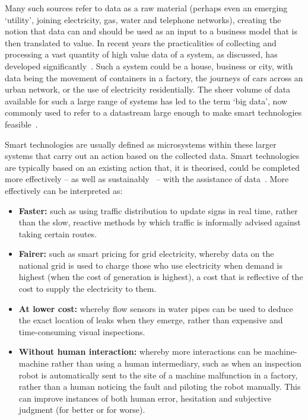\documentclass[journal]{IEEEtran}
\begin{document}
Many such sources refer to data as a raw material (perhaps even an
emerging `utility', joining electricity, gas, water and telephone
networks), creating the notion that data can and should be used as an
input to a business model that is then translated to value. In recent
years the practicalities of collecting and processing a vast quantity
of high value data of a system, as discussed, has developed
significantly~\cite{arup-et-al:2011}. Such a system could be a house,
business or city, with data being the movement of containers in a
factory, the journeys of cars across an urban network, or the use of
electricity residentially. The sheer volume of data available for such
a large range of systems has led to the term `big data’, now commonly
used to refer to a datastream large enough to make smart technologies
feasible~\cite{hollands:2008,ibmsmartcities:2009,ciscoconcities:2010}.

Smart technologies are usually defined as microsystems within these
larger systems that carry out an action based on the collected
data. Smart technologies are typically based on an existing action
that, it is theorised, could be completed more effectively -- as well
as sustainably~\cite{cosgrave-et-al:2014} -- with the assistance of
data~\cite{arup-et-al:2011}. More effectively can be interpreted as:

\begin{itemize}
\item {\textbf{Faster:}} such as using traffic distribution to update
  signs in real time, rather than the slow, reactive methods
  by which traffic is informally advised against taking certain
  routes.
\item {\textbf{Fairer:}} such as smart pricing for grid electricity,
  whereby data on the national grid is used to charge those who
  use electricity when demand is highest (when the cost of generation
  is highest), a cost that is reflective of the cost to supply the
  electricity to them. 
\item {\textbf{At lower cost:}} whereby flow sensors in water pipes
  can be used to deduce the exact location of leaks when they emerge,
  rather than expensive and time-consuming visual inspections.
\item {\textbf{Without human interaction:}} whereby more interactions
  can be machine-machine rather than using a human intermediary, such
  as when an inspection robot is automatically sent to the site of a
  machine malfunction in a factory, rather than a human noticing the
  fault and piloting the robot manually. This can improve instances of
  both human error, hesitation and subjective judgment (for better or
  for worse). 
\end{itemize}
\end{document}

